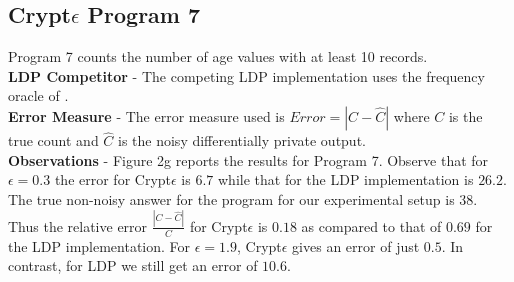 \subsection*{Crypt$\epsilon$ Program 7}
Program 7 counts the number of age values with at least 10 records.  
\\\textbf{\textsf{LDP} Competitor} - The competing \textsf{LDP} implementation uses the frequency oracle of \cite{LDP1}. 
\\\textbf{Error Measure} - The error measure used is  $Error = |C-\hat{C}|$ where $C$ is the true count and $\hat{C}$ is the noisy differentially private output. 
\\\textbf{Observations} - Figure 2g reports the results for Program 7. Observe that for $\epsilon=0.3$ the error for Crypt$\epsilon$ is $6.7$ while that for the \textsf{LDP} implementation is $26.2$. The true non-noisy answer for the program for our experimental setup is $38$. Thus the relative error $\frac{|C-\hat{C}|}{C}$ for Crypt$\epsilon$ is $0.18$ as compared to that of $0.69$ for the \textsf{LDP} implementation.  For $\epsilon=1.9$, Crypt$\epsilon$ gives an error of just $0.5$. In contrast,  for \textsf{LDP} we still get an error of $10.6$. 